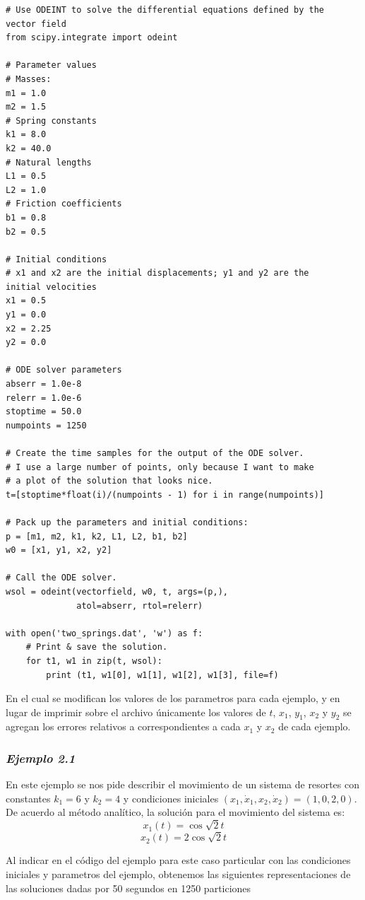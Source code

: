 \documentclass{article}
\begin{document}
\begin{framed}
\begin{verbatim}
# Use ODEINT to solve the differential equations defined by the
vector field
from scipy.integrate import odeint

# Parameter values
# Masses:
m1 = 1.0
m2 = 1.5
# Spring constants
k1 = 8.0
k2 = 40.0
# Natural lengths
L1 = 0.5
L2 = 1.0
# Friction coefficients
b1 = 0.8
b2 = 0.5

# Initial conditions
# x1 and x2 are the initial displacements; y1 and y2 are the 
initial velocities
x1 = 0.5
y1 = 0.0
x2 = 2.25
y2 = 0.0

# ODE solver parameters
abserr = 1.0e-8
relerr = 1.0e-6
stoptime = 50.0
numpoints = 1250

# Create the time samples for the output of the ODE solver.
# I use a large number of points, only because I want to make
# a plot of the solution that looks nice.
t=[stoptime*float(i)/(numpoints - 1) for i in range(numpoints)]

# Pack up the parameters and initial conditions:
p = [m1, m2, k1, k2, L1, L2, b1, b2]
w0 = [x1, y1, x2, y2]

# Call the ODE solver.
wsol = odeint(vectorfield, w0, t, args=(p,),
              atol=abserr, rtol=relerr)

with open('two_springs.dat', 'w') as f:
    # Print & save the solution.
    for t1, w1 in zip(t, wsol):
        print (t1, w1[0], w1[1], w1[2], w1[3], file=f)
\end{verbatim}
\end{framed}

En el cual se modifican los valores de los parametros para cada ejemplo, y en lugar de imprimir sobre el archivo únicamente los valores de $t$, $x_1$, $y_1$, $x_2$ y $y_2$ se agregan los errores relativos a correspondientes a cada $x_1$ y $x_2$ de cada ejemplo.

\subsubsection*{\textit{Ejemplo 2.1}}

En este ejemplo se nos pide describir el movimiento de un sistema de resortes con constantes $k_1=6$ y $k_2=4$ y condiciones iniciales $(x_1,\dot{x}_1,x_2,\dot{x}_2)=(1,0,2,0)$. De acuerdo al método analítico, la solución para el movimiento del sistema es:
\[ x_1(t)=\cos\sqrt{2}t \]
\[ x_2(t)=2\cos\sqrt{2}t \]

Al indicar en el código del ejemplo para este caso particular con las condiciones iniciales y parametros del ejemplo, obtenemos las siguientes representaciones de las soluciones dadas por 50 segundos en 1250 particiones
\end{document}

